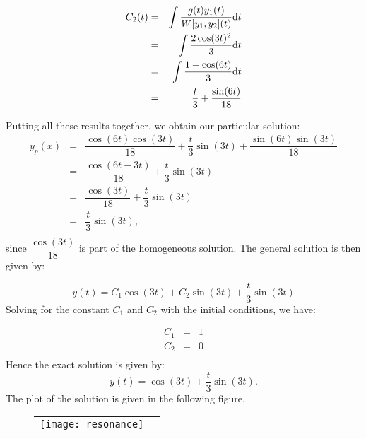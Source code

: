 \documentclass[11pt]{article}
\begin{document}
\begin{solution}
\begin{eqnarray*}
C_{2}(t) & = &  \int \dfrac{g(t) y_{1}(t)}{W[y_{1},y_{2}](t)} {\rm d} t \\
& = &  \int \dfrac{2\cos(3t)^2}{3} {\rm d} t \\
& = & \int \dfrac{1+\cos(6t)}{3} {\rm d} t \\
& = & \dfrac{t}{3}+ \dfrac{\sin(6t)}{18}  \\
\end{eqnarray*}

Putting all these results together, we obtain our particular solution:
\begin{eqnarray*}
y_{p}(x) & = & \dfrac{\cos(6t) \cos(3t) }{18} + \dfrac{t}{3} \sin(3t) + \dfrac{\sin(6t) \sin(3t) }{18} \\
          & = & \dfrac{\cos(6t-3t)}{18} + \dfrac{t}{3} \sin(3t)\\
          & = & \dfrac{\cos(3t)}{18} + \dfrac{t}{3} \sin(3t)\\
          & = & \dfrac{t}{3} \sin(3t),\\
\end{eqnarray*}
since $\dfrac{\cos(3t)}{18}$ is part of the homogeneous solution. The general solution is then given by:

\begin{equation}
y(t) = C_{1} \cos(3 t) + C_{2} \sin(3 t) + \dfrac{t}{3} \sin(3t)
\end{equation}
Solving for the constant $C_{1}$ and $C_{2}$ with the initial conditions, we have:

\begin{eqnarray}
C_{1} & = & 1\\
C_{2} & = & 0\\
\end{eqnarray}
Hence the exact solution is given by:
\begin{equation}
y(t) = \cos(3 t)+ \dfrac{t}{3} \sin(3t).
\end{equation}
The plot of the solution is given in the following figure.
\begin{figure}[htb]
\begin{center}
\begin{tabular}{cc} \texttt{[image: resonance]} \\
\end{tabular}
\end{center}
\end{figure}
\end{solution}
\end{document}
